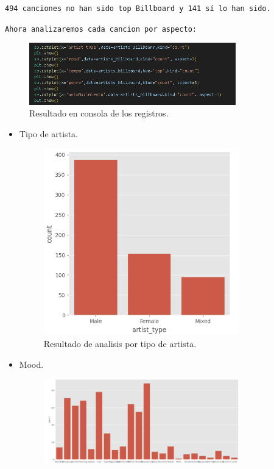 \documentclass[a4paper,12pt]{article}
\begin{document}
\texttt{494 canciones no han sido top Billboard y 141 sí lo han sido.}

\texttt{Ahora analizaremos cada cancion por aspecto: }
\begin{figure}[H]
    \centering
    \includegraphics[width=0.8\textwidth]{6.png}
    \caption{Resultado en consola de los registros.}
    \label{fig:decision_tree}
\end{figure}
\begin{itemize}
    \item Tipo de artista.
    \begin{figure}[H]
        \centering
        \includegraphics[width=0.8\textwidth]{7.png}
        \caption{Resultado de analisis por tipo de artista.}
        \label{fig:decision_tree}
    \end{figure}
    \item Mood.
    \begin{figure}[H]
        \centering
        \includegraphics[width=0.8\textwidth]{8.png}

\end{figure}
\end{itemize}
\end{document}
